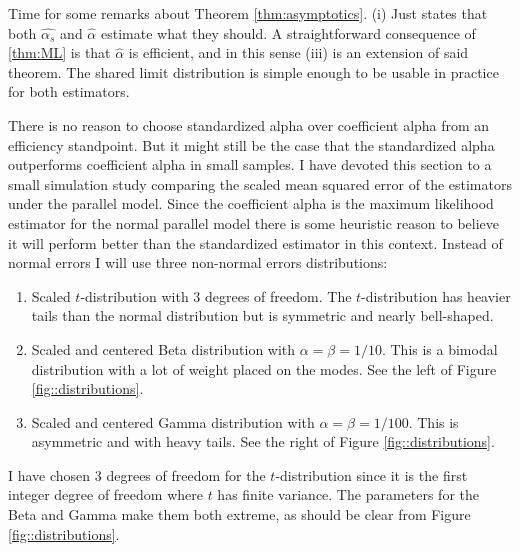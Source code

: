 \documentclass{article}
\theoremstyle{plain}
\theoremstyle{plain}
\theoremstyle{definition}
\theoremstyle{remark}
\theoremstyle{definition}
\theoremstyle{plain}
\theoremstyle{plain}
\theoremstyle{definition}
\begin{document}
Time for some remarks about Theorem \ref{thm:asymptotics}. (i) Just states that both $\widehat{\alpha_s}$ and $\widehat{\alpha}$ estimate what they should. A straightforward consequence of \ref{thm:ML} is that $\widehat{\alpha}$ is efficient, and in this sense (iii) is an extension of said theorem. The shared limit distribution is simple enough to be usable in practice for both estimators. 

There is no reason to choose standardized alpha over coefficient alpha from an efficiency standpoint. But it might still be the case
that the standardized alpha outperforms coefficient alpha
in small samples. I have devoted this section to a small simulation
study comparing the scaled mean squared error of the estimators under
the parallel model. Since the coefficient alpha is the maximum likelihood
estimator for the normal parallel model there is some heuristic reason
to believe it will perform better than the standardized estimator
in this context. Instead of normal errors I will use three non-normal
errors distributions:

\begin{enumerate}
\item Scaled $t$-distribution with $3$ degrees of freedom. The $t$-distribution
has heavier tails than the normal distribution but is symmetric and nearly bell-shaped. 
\item Scaled and centered Beta distribution with $\alpha=\beta=1/10$. This is a bimodal distribution with a lot of weight placed on the modes. See the left of Figure \ref{fig::distributions}.
\item Scaled and centered Gamma distribution with $\alpha=\beta=1/100$. This is asymmetric and with heavy tails. See the right of Figure \ref{fig::distributions}.
\end{enumerate}

I have chosen $3$ degrees of freedom for the $t$-distribution since it is the first integer degree of freedom where $t$ has finite variance. The parameters for the Beta and Gamma make them both extreme, as should be clear from Figure \ref{fig::distributions}.
\end{document}
